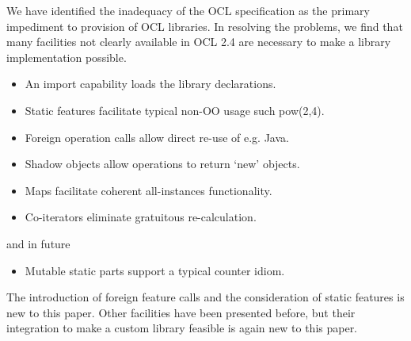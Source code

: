 \documentclass[sigconf]{acmart}
\begin{document}
We have identified the inadequacy of the OCL specification as the primary impediment to provision of OCL libraries. In resolving the problems, we find that many facilities not clearly available in OCL 2.4 are necessary to make a library implementation possible.

\begin{itemize}
	\item An import capability loads the library declarations.
	\item Static features facilitate typical non-OO usage such pow(2,4).
	\item Foreign operation calls allow direct re-use of e.g. Java.
	\item Shadow objects allow operations to return `new' objects.
	\item Maps facilitate coherent all-instances functionality.
	\item Co-iterators eliminate gratuitous re-calculation.
\end{itemize}
and in future
\begin{itemize}
	\item Mutable static parts support a typical counter idiom.
\end{itemize}

The introduction of foreign feature calls and the consideration of static features is new to this paper. Other facilities have been presented before, but their integration to make a custom library feasible is again new to this paper.



\end{document}
